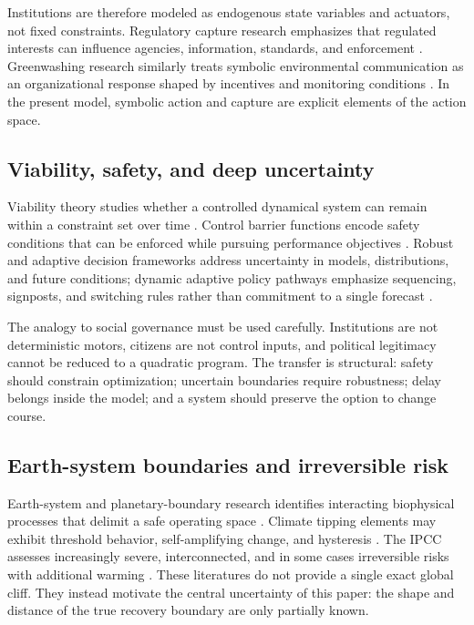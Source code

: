 \documentclass[11pt,a4paper]{article}
\numberwithin{equation}{section}
\theoremstyle{definition}
\theoremstyle{plain}
\theoremstyle{remark}
\begin{document}
Institutions are therefore modeled as endogenous state variables and actuators, not fixed constraints. Regulatory capture research emphasizes that regulated interests can influence agencies, information, standards, and enforcement \citep{carpentermoss2014}. Greenwashing research similarly treats symbolic environmental communication as an organizational response shaped by incentives and monitoring conditions \citep{delmasburbano2011}. In the present model, symbolic action and capture are explicit elements of the action space.

\subsection{Viability, safety, and deep uncertainty}

Viability theory studies whether a controlled dynamical system can remain within a constraint set over time \citep{aubin2011}. Control barrier functions encode safety conditions that can be enforced while pursuing performance objectives \citep{ames2017,ames2019}. Robust and adaptive decision frameworks address uncertainty in models, distributions, and future conditions; dynamic adaptive policy pathways emphasize sequencing, signposts, and switching rules rather than commitment to a single forecast \citep{haasnoot2013,kwakkel2016}.

The analogy to social governance must be used carefully. Institutions are not deterministic motors, citizens are not control inputs, and political legitimacy cannot be reduced to a quadratic program. The transfer is structural: safety should constrain optimization; uncertain boundaries require robustness; delay belongs inside the model; and a system should preserve the option to change course.

\subsection{Earth-system boundaries and irreversible risk}

Earth-system and planetary-boundary research identifies interacting biophysical processes that delimit a safe operating space \citep{rockstrom2023,richardson2023}. Climate tipping elements may exhibit threshold behavior, self-amplifying change, and hysteresis \citep{scheffer2009,armstrong2022}. The IPCC assesses increasingly severe, interconnected, and in some cases irreversible risks with additional warming \citep{ipcc2022,ipcc2023}. These literatures do not provide a single exact global cliff. They instead motivate the central uncertainty of this paper: the shape and distance of the true recovery boundary are only partially known.
\end{document}
